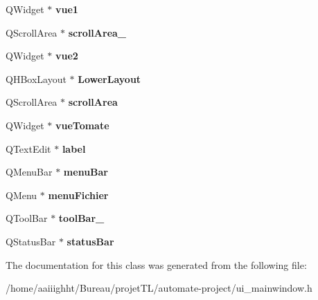 \begin{DoxyCompactItemize}
\item 
\hypertarget{class_ui___main_window_aa2c474a2cfe4718e65713642aa1c6955}{Q\-Widget $\ast$ {\bfseries vue1}}\label{class_ui___main_window_aa2c474a2cfe4718e65713642aa1c6955}

\item 
\hypertarget{class_ui___main_window_aa5235ac9317e2feffc8a844ce126ffef}{Q\-Scroll\-Area $\ast$ {\bfseries scroll\-Area\-\_}}\label{class_ui___main_window_aa5235ac9317e2feffc8a844ce126ffef}

\item 
\hypertarget{class_ui___main_window_a55ae78ec8fc0ae89aea26980898878bb}{Q\-Widget $\ast$ {\bfseries vue2}}\label{class_ui___main_window_a55ae78ec8fc0ae89aea26980898878bb}

\item 
\hypertarget{class_ui___main_window_a0cbafe1a716516744a60eb7b41120c20}{Q\-H\-Box\-Layout $\ast$ {\bfseries Lower\-Layout}}\label{class_ui___main_window_a0cbafe1a716516744a60eb7b41120c20}

\item 
\hypertarget{class_ui___main_window_ac5779d53b47a565785fec252abb1b3c6}{Q\-Scroll\-Area $\ast$ {\bfseries scroll\-Area}}\label{class_ui___main_window_ac5779d53b47a565785fec252abb1b3c6}

\item 
\hypertarget{class_ui___main_window_a2aaf3452f98efec828e1d63105a8cf0e}{Q\-Widget $\ast$ {\bfseries vue\-Tomate}}\label{class_ui___main_window_a2aaf3452f98efec828e1d63105a8cf0e}

\item 
\hypertarget{class_ui___main_window_a626cde87789b61eec68477425caf704e}{Q\-Text\-Edit $\ast$ {\bfseries label}}\label{class_ui___main_window_a626cde87789b61eec68477425caf704e}

\item 
\hypertarget{class_ui___main_window_a2be1c24ec9adfca18e1dcc951931457f}{Q\-Menu\-Bar $\ast$ {\bfseries menu\-Bar}}\label{class_ui___main_window_a2be1c24ec9adfca18e1dcc951931457f}

\item 
\hypertarget{class_ui___main_window_a7d7b4b19240d3d65b39fbfb5ee49538a}{Q\-Menu $\ast$ {\bfseries menu\-Fichier}}\label{class_ui___main_window_a7d7b4b19240d3d65b39fbfb5ee49538a}

\item 
\hypertarget{class_ui___main_window_a5fc53408d466b2c64213d2edd23bb86e}{Q\-Tool\-Bar $\ast$ {\bfseries tool\-Bar\-\_}}\label{class_ui___main_window_a5fc53408d466b2c64213d2edd23bb86e}

\item 
\hypertarget{class_ui___main_window_a50fa481337604bcc8bf68de18ab16ecd}{Q\-Status\-Bar $\ast$ {\bfseries status\-Bar}}\label{class_ui___main_window_a50fa481337604bcc8bf68de18ab16ecd}

\end{DoxyCompactItemize}


The documentation for this class was generated from the following file\-:\begin{DoxyCompactItemize}
\item 
/home/aaiiighht/\-Bureau/projet\-T\-L/automate-\/project/ui\-\_\-mainwindow.\-h\end{DoxyCompactItemize}
